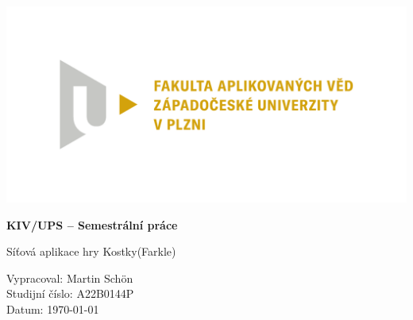 \documentclass[12pt, a4paper]{article}
\newcommand{\Subject}{KIV/UPS}
\newcommand{\TypeOfWork}{Semestrální práce}
\newcommand{\WorkFor}{\Subject\- -- \TypeOfWork}
\newcommand{\NameOfProject}{Síťová aplikace hry Kostky(Farkle)}
\newcommand{\Autor}{Martin Schön}
\newcommand{\Id}{A22B0144P}
\newcommand{\Date}{\today}
\begin{document}
\begin{titlepage}
    \begin{center}
        
        \includegraphics[width=\textwidth]{Images/fav.pdf}
        
        \vspace{2cm}
        
        \huge
        \textbf{\WorkFor}
        
        \vspace{1cm}
        
        \huge
        \NameOfProject
        
        \vfill
        
        \vspace{0.5cm}
        
        \normalsize
        \raggedright
        Vypracoval: \Autor \\
        Studijní číslo: \Id \\
        Datum: \Date
        \vspace{0.2cm}
        
    \end{center}
\end{titlepage}
\thispagestyle{empty}
\pagebreak

\renewcommand{\cftsecleader}{\cftdotfill{\cftdotsep}}
\renewcommand{\cftsubsecleader}{\cftdotfill{\cftdotsep}}
\renewcommand{\cftsubsubsecleader}{\cftdotfill{\cftdotsep}}

\setcounter{page}{2}
\tableofcontents
\newpage
\end{document}
